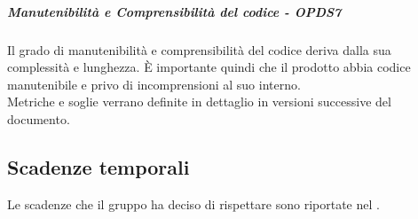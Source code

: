 \documentclass[PianoDiQualifica.tex]{subfiles}
\begin{document}
				\subparagraph{Manutenibilità e Comprensibilità del codice - OPDS7}
				Il grado di manutenibilità e comprensibilità del codice deriva dalla sua complessità e lunghezza. È importante quindi che il prodotto abbia codice manutenibile e
				privo di incomprensioni al suo interno. \\
				Metriche e soglie verrano definite in dettaglio in versioni successive del documento.

		\subsection{Scadenze temporali}
		Le scadenze che il gruppo \GRUPPO{} ha deciso di rispettare sono riportate nel \PPdoc{}.
\end{document}
